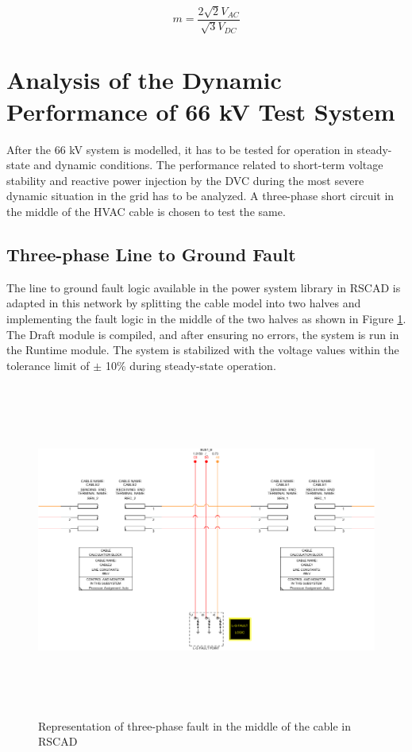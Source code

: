 \begin{equation}\label{MI_eq}
    m = \frac{2\sqrt{2} V_{AC}}{\sqrt{3} {V_{DC}}}
\end{equation}

\section{Analysis of the Dynamic Performance of 66 kV Test System}
After the 66 kV system is modelled, it has to be tested for operation in steady-state and dynamic conditions. The performance related to short-term voltage stability and reactive power injection by the \gls{DVC} during the most severe dynamic situation in the grid has to be analyzed. A three-phase short circuit in the middle of the \gls{HVAC} cable is chosen to test the same.

\subsection{Three-phase Line to Ground Fault}

The line to ground fault logic available in the power system library in RSCAD is adapted in this network by splitting the cable model into two halves and implementing the fault logic in the middle of the two halves as shown in Figure \ref{fig:2cablesblockwithfault}. %
The Draft module is compiled, and after ensuring no errors, the system is run in the Runtime module. The system is stabilized with the voltage values within the tolerance limit of $\pm$ 10\% during steady-state operation.

\begin{figure}[H]
\centering
    \includegraphics[height = 11cm,width = \textwidth]{Diagrams/Chapter_3/2CablesBlockWithFault.pdf}
    \caption{Representation of three-phase fault in the middle of the cable in RSCAD}
    \label{fig:2cablesblockwithfault}
\end{figure}

